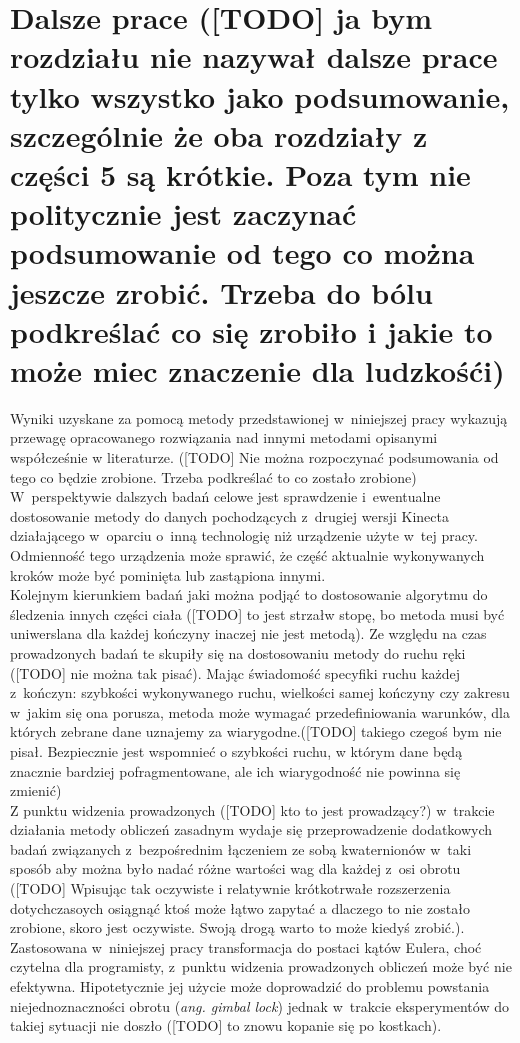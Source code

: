\cleardoublepage
{}
\chapter{Dalsze prace ([TODO] ja bym rozdziału nie nazywał dalsze prace tylko wszystko jako podsumowanie, szczególnie że oba rozdziały z części 5 są krótkie. Poza tym nie politycznie jest zaczynać podsumowanie od tego co można jeszcze zrobić. Trzeba do bólu podkreślać co się zrobiło i jakie to może miec znaczenie dla ludzkośći)}\label{chap:durther}
Wyniki uzyskane za pomocą metody przedstawionej w~niniejszej pracy wykazują przewagę opracowanego rozwiązania nad innymi metodami opisanymi współcześnie w literaturze. ([TODO] Nie można rozpoczynać podsumowania od tego co będzie zrobione. Trzeba podkreślać to co zostało zrobione) W~perspektywie dalszych badań celowe jest sprawdzenie i~ewentualne dostosowanie metody do danych pochodzących z~drugiej wersji Kinecta działającego w~oparciu o~inną technologię niż urządzenie użyte w~tej pracy. Odmienność tego urządzenia może sprawić, że część aktualnie wykonywanych kroków może być pominięta lub zastąpiona innymi. \\

Kolejnym kierunkiem badań jaki można podjąć to dostosowanie algorytmu do śledzenia innych części ciała ([TODO] to jest strzałw stopę, bo metoda musi być uniwerslana dla każdej kończyny inaczej nie jest metodą). Ze względu na czas prowadzonych badań te skupiły się na dostosowaniu metody do ruchu ręki ([TODO] nie można tak pisać). Mając świadomość specyfiki ruchu każdej z~kończyn: szybkości wykonywanego ruchu, wielkości samej kończyny czy zakresu w~jakim się ona porusza, metoda może wymagać przedefiniowania warunków, dla których zebrane dane uznajemy za wiarygodne.([TODO] takiego czegoś bym nie pisał. Bezpiecznie jest wspomnieć o szybkości ruchu, w którym dane będą znacznie bardziej pofragmentowane, ale ich wiarygodność nie powinna się zmienić)\\

Z punktu widzenia prowadzonych ([TODO] kto to jest prowadzący?) w~trakcie działania metody obliczeń zasadnym wydaje się przeprowadzenie dodatkowych badań związanych z~bezpośrednim łączeniem ze sobą kwaternionów w~taki sposób aby można było nadać różne wartości wag dla każdej z~osi obrotu ([TODO] Wpisując tak oczywiste i relatywnie krótkotrwałe rozszerzenia dotychczasoych osiągnąć ktoś może łątwo zapytać a dlaczego to nie zostało zrobione, skoro jest oczywiste. Swoją drogą warto to może kiedyś zrobić.). Zastosowana w~niniejszej pracy transformacja do postaci kątów Eulera, choć czytelna dla programisty, z~punktu widzenia prowadzonych obliczeń może być nie efektywna. Hipotetycznie jej użycie może doprowadzić do problemu powstania niejednoznaczności obrotu (\emph{ang. gimbal lock}) jednak w~trakcie eksperymentów do takiej sytuacji nie doszło ([TODO] to znowu kopanie się po kostkach).\\

